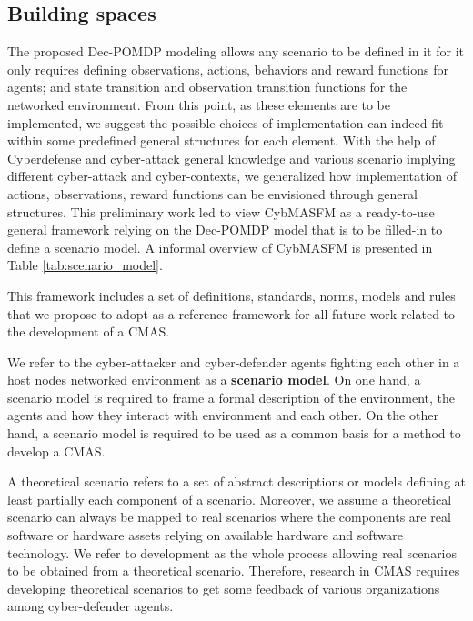 \documentclass[conference]{IEEEtran}
\begin{document}
\subsection{Building spaces}

The proposed Dec-POMDP modeling\cite{soule2023} allows any scenario to be defined in it for it only requires defining observations, actions, behaviors and reward functions for agents; and state transition and observation transition functions for the networked environment.
From this point, as these elements are to be implemented, we suggest the possible choices of implementation can indeed fit within some predefined general structures for each element. With the help of Cyberdefense and cyber-attack general knowledge and various scenario implying different cyber-attack and cyber-contexts, we generalized how implementation of actions, observations, reward functions can be envisioned through general structures. This preliminary work led to view CybMASFM as a ready-to-use general framework relying on the Dec-POMDP model that is to be filled-in to define a scenario model.
A informal overview of CybMASFM is presented in Table \ref{tab:scenario_model}.



This framework includes a set of definitions, standards, norms, models and rules that we propose to adopt as a reference framework for all future work related to the development of a CMAS.

We refer to the cyber-attacker and cyber-defender agents fighting each other in a host nodes networked environment as a \textbf{scenario model}. On one hand, a scenario model is required to frame a formal description of the environment, the agents and how they interact with environment and each other. On the other hand, a scenario model is required to be used as a common basis for a method to develop a CMAS.

A theoretical scenario refers to a set of abstract descriptions or models defining at least partially each component of a scenario. Moreover, we assume a theoretical scenario can always be mapped to real scenarios where the components are real software or hardware assets relying on available hardware and software technology. We refer to development as the whole process allowing real scenarios to be obtained from a theoretical scenario. Therefore, research in CMAS requires developing theoretical scenarios to get some feedback of various organizations among cyber-defender agents.
\end{document}
